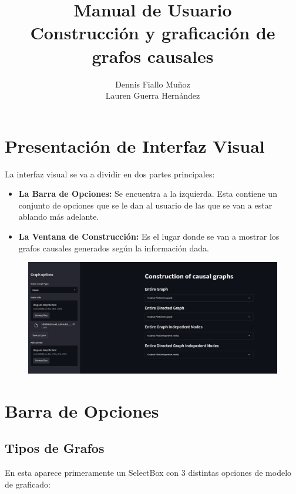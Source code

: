 \documentclass[spanish]{article}
\title{Manual de Usuario\\
    \large Construcción y graficación de grafos causales}
\author{ Dennis Fiallo Muñoz \\ Lauren Guerra Hernández}
\date{}
\begin{document}
\maketitle

\section*{Presentación de Interfaz Visual}

La interfaz visual se va a dividir en dos partes principales:
\begin{itemize}
    \item \textbf{La Barra de Opciones:} Se encuentra a la izquierda. Esta contiene un conjunto de opciones que se le dan al usuario de las que se van a estar ablando más adelante.
    \item \textbf{La Ventana de Construcción:} Es el lugar donde se van a mostrar los grafos causales generados según la información dada.
\end{itemize}

\begin{figure}[H]
    \includegraphics[scale=0.35]{allvisual.png}
\end{figure}	


\section*{Barra de Opciones}

\subsection*{Tipos de Grafos}
En esta aparece primeramente un SelectBox con 3 distintas opciones de modelo de graficado:
\end{document}
